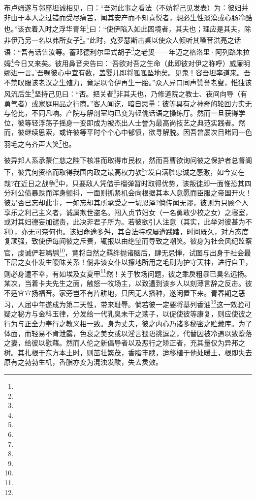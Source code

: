 \par 布卢姆遂与邻座坦诚相见，曰：“吾对此事之看法（不妨将己见发表）为：彼妇并非由于本人之过错而受尽痛苦，闻其安产而不知喜悦者，想必生性淡漠或心肠冷酷也。”该衣着入时之浮华青年\footnote{}曰：“使伊陷入如此困境者，其夫也；理应是其夫，除非伊乃另一名以弗所女子\footnote{}。”此时，克罗瑟斯击桌以使众人倾听其嗓音洪亮之话语：“吾有话告汝等。蓄邓德利尔里式胡子\footnote{}之老叟——年迈之格洛里·阿列路朱拉姆\footnote{}今日又来矣。彼用鼻音央告曰：‘吾欲对吾之生命（此即彼对伊之称呼）威廉明娜进一言。’吾嘱彼心中宜有数，盖婴儿即将呱呱坠地矣。见鬼！容吾坦率道来。吾不禁叹服该老汉之生殖力，竟足以令伊再生一胎。”众人异口同声赞誉老叟，惟独该风流后生\footnote{}坚持己见曰：“否。把关者\footnote{}非其夫也，乃修道院之教士、夜间向导（有勇气者）或家庭用品之行商。”客人闻讫，暗自思量：彼等具有之神奇的轮回力实无与伦比，不同凡响。产院与解剖室均已变为轻佻话语之操练厅。然而一旦获得学位，彼等轻浮荡子摇身一变即成为被杰出人士誉为最高尚技艺之典范实践者。然而，彼继续思索，或许彼等平时个个心中郁愤，欲寻解脱。因吾曾屡次目睹同一色羽毛之鸟齐声大笑\footnote{}也。
\par 彼异邦人系承蒙仁慈之陛下核准而取得市民权，然而吾曹欲询问彼之保护者总督阁下，彼凭何资格而取得我国内政之最高权力欤\footnote{}?发自满腔忠诚之感激，如今安在哉?在近日之战争\footnote{}中，只要敌人凭借手榴弹暂时取得优势，该叛徒即一面惟恐其四分利公债暴跌而浑身颤抖，一面则抓紧机会向根据其本人意愿而臣服之帝国开火！彼是否已忘却此事，一如忘却其所承受之一切恩泽?倘传闻无谬，彼则为只顾个人享乐之利己主义者，诚属欺世盗名。闯入贞节妇女（一名勇敢少校之女）之寝室，或对其妇德妄加谴责，此决非君子所为。若彼欲引人注意（其实，此举对彼甚为不利），亦无可奈何也。该妇命途多舛，其合法特权屡遭践踏，时间既久，对方态度复顽强，致使伊每闻彼之斥责，辄报以由绝望而导致之嘲笑。彼身为社会风纪监察官，虔诚俨若鹈鹕\footnote{}，竟将自然之羁绊抛诸脑后，肆无忌惮，试图与出身于社会最下层之女仆发生暧昧关系！倘非该女仆以擦地所用之毛刷为护守天神，进行自卫，则必身遭不幸，有如埃及女夏甲\footnote{}然！关于牧场问题，彼之乖戾粗暴已臭名远扬。某次，当着卡夫先生之面，触怒一牧场主，以致遭到该乡人以刻薄言辞之反击。彼不适宜宣扬福音。家旁岂不有片耕地，只因无人播种，遂闲置下来。青春期之恶习，人届中年遂成为第二天性，带来耻辱。倘若彼一定要将基列香油\footnote{}这一效验可疑之秘方与金科玉律，分发给一代乳臭未干之荡子，以促使彼等康复，则应使彼之行为与正全力奉行之教义相一致。身为丈夫，彼之内心乃诸多秘密之贮藏库。为了体面，而轻易不肯泄露，色衰之美女或以淫言猥语挑逗之，代替因被冷遇以致堕落之妻，给彼以慰藉。然而人伦之新倡导者以及恶行之矫正者，充其量仅为异邦之树。其扎根于东方本土时，则茁壮繁茂，香脂丰腴，迨移植于他处暖土，根即失去原有之勃勃生机，香脂亦变为混浊发酸，失去灵效。
